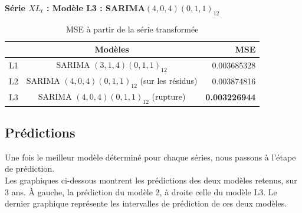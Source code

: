 \documentclass[12pt,a4paper]{book}
\newcommand{\1}{\mathds{1}}
\begin{document}
\noindent
\textbf{Série $XL_t$ : Modèle L3 : SARIMA$(4,0,4)(0,1,1)_{12}$}

\begin{table}[h!]
  \begin{center}
    \caption{MSE à partir de la série transformée}
    \label{tab:table1}
    \begin{tabular}{l|c|r} 
      \ & \textbf{Modèles} & \textbf{MSE}\\
      \hline
      L1 & SARIMA $(3,1,4)(0,1,1)_{12}$ & 0.003685328\\
      L2 & SARIMA $(4,0,4)(0,1,1)_{12}$ (sur les résidus)& 0.003874816\\
      \rowcolor{LightCyan}
      L3 & SARIMA $(4,0,4)(0,1,1)_{12}$ (rupture)& \textbf{0.003226944}\\
    \end{tabular}
  \end{center}
\end{table}

\vspace{5 mm}
\subsection{Prédictions}

Une fois le meilleur modèle déterminé pour chaque séries, nous passons à l'étape de prédiction.\\
Les graphiques ci-dessous montrent les prédictions des deux modèles retenus, sur 3 ans. À gauche, la prédiction du modèle 2, à droite celle du modèle L3. Le dernier graphique représente les intervalles de prédiction de ces deux modèles.
\end{document}
